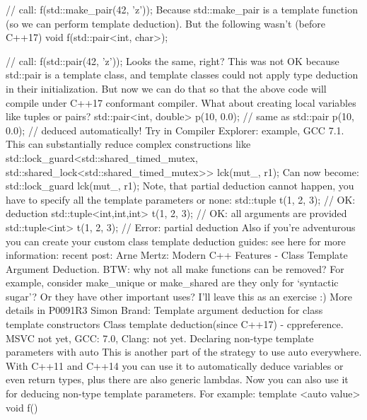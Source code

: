 // call:
f(std::make_pair(42, 'z'));
Because std::make_pair is a template function (so we can perform template deduction).
But the following wasn’t (before C++17)
void f(std::pair<int, char>);

// call:
f(std::pair(42, 'z'));
Looks the same, right? This was not OK because std::pair is a template class, and template classes could not apply type deduction in their initialization. 
But now we can do that so that the above code will compile under C++17 conformant compiler.
What about creating local variables like tuples or pairs?
std::pair<int, double> p(10, 0.0);
// same as
std::pair p(10, 0.0); // deduced automatically!
Try in Compiler Explorer: example, GCC 7.1.
This can substantially reduce complex constructions like
std::lock_guard<std::shared_timed_mutex, 
        std::shared_lock<std::shared_timed_mutex>> lck(mut_, r1);
Can now become:
std::lock_guard lck(mut_, r1);
Note, that partial deduction cannot happen, you have to specify all the template parameters or none:
std::tuple t(1, 2, 3);              // OK: deduction
std::tuple<int,int,int> t(1, 2, 3); // OK: all arguments are provided
std::tuple<int> t(1, 2, 3);         // Error: partial deduction
Also if you’re adventurous you can create your custom class template deduction guides: see here for more information: recent post: Arne Mertz: Modern C++ Features - Class Template Argument Deduction.
BTW: why not all make functions can be removed? For example, consider make_unique or make_shared are they only for ‘syntactic sugar’? Or they have other important uses? I’ll leave this as an exercise :)
More details in 
P0091R3 
Simon Brand: Template argument deduction for class template constructors
Class template deduction(since C++17) - cppreference. 
MSVC not yet, GCC: 7.0, Clang: not yet.
Declaring non-type template parameters with auto
This is another part of the strategy to use auto everywhere. With C++11 and C++14 you can use it to automatically deduce variables or even return types, plus there are also generic lambdas. Now you can also use it for deducing non-type template parameters.
For example:
template <auto value> void f() { }

